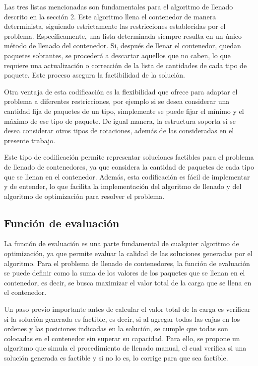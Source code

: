 Las tres listas mencionadas son fundamentales para el algoritmo de llenado descrito en la sección 2. Este algoritmo llena el contenedor de manera determinista, siguiendo estrictamente las restricciones establecidas por el problema. Específicamente, una lista determinada siempre resulta en un único método de llenado del contenedor. Si, después de llenar el contenedor, quedan paquetes sobrantes, se procederá a descartar aquellos que no caben, lo que requiere una actualización o corrección de la lista de cantidades de cada tipo de paquete. Este proceso asegura la factibilidad de la solución.

Otra ventaja de esta codificación es la flexibilidad que ofrece para adaptar el problema a diferentes restricciones, por ejemplo si se desea considerar una cantidad fija de paquetes de un tipo, simplemente se puede fijar el mínimo y el máximo de ese tipo de paquete. De igual manera, la estructura soporta si se desea considerar otros tipos de rotaciones, además de las consideradas en el presente trabajo.

Este tipo de codificación permite representar soluciones factibles para el problema de llenado de contenedores, ya que considera la cantidad de paquetes de cada tipo que se llenan en el contenedor. Además, esta codificación es fácil de implementar y de entender, lo que facilita la implementación del algoritmo de llenado y del algoritmo de optimización para resolver el problema.

\subsection{Función de evaluación}

La función de evaluación es una parte fundamental de cualquier algoritmo de optimización, ya que permite evaluar la calidad de las soluciones generadas por el algoritmo. Para el problema de llenado de contenedores, la función de evaluación se puede definir como la suma de los valores de los paquetes que se llenan en el contenedor, es decir, se busca maximizar el valor total de la carga que se llena en el contenedor.

Un paso previo importante antes de calcular el valor total de la carga es verificar si la solución generada es factible, es decir, si al agregar todas las cajas en los ordenes y las posiciones indicadas en la solución, se cumple que todas son colocadas en el contenedor sin superar su capacidad. Para ello, se propone un algoritmo que simula el procedimiento de llenado manual, el cual verifica si una solución generada es factible y si no lo es, lo corrige para que sea factible.

